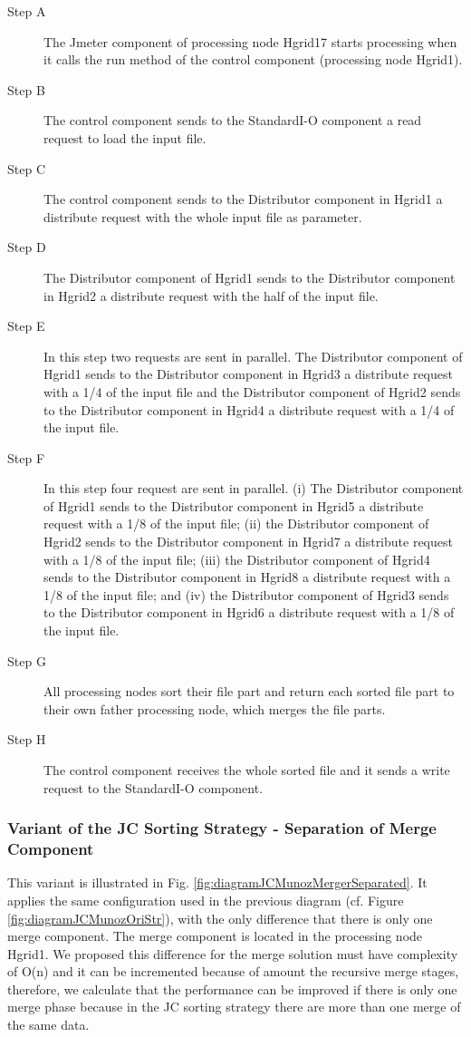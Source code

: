 \begin{description}
	\item [Step A] The Jmeter component of processing node Hgrid17 starts processing when it calls the run method of the control component (processing node Hgrid1).
	\item [Step B] The control component sends to the StandardI-O component a read request to load the input file.
	\item [Step C] The control component sends to the Distributor component in Hgrid1 a distribute request with the whole input file as parameter.
	\item [Step D] The Distributor component of Hgrid1 sends to the Distributor component in Hgrid2 a distribute request with the half of the input file.
	\item [Step E] In this step two requests are sent in parallel. The Distributor component of Hgrid1 sends to the Distributor component in Hgrid3 a distribute request with a 1/4 of the input file and the Distributor component of Hgrid2 sends to the Distributor component in Hgrid4 a distribute request with a 1/4 of the input file.
	\item [Step F] In this step four request are sent in parallel. (i) The Distributor component of Hgrid1 sends to the Distributor component in Hgrid5 a distribute request with a 1/8 of the input file; (ii) the Distributor component of Hgrid2 sends to the Distributor component in Hgrid7 a distribute request with a 1/8 of the input file; (iii) the Distributor component of Hgrid4 sends to the Distributor component in Hgrid8 a distribute request with a 1/8 of the input file; and (iv) the Distributor component of Hgrid3 sends to the Distributor component in Hgrid6 a distribute request with a 1/8 of the input file.
	\item [Step G] All processing nodes sort their file part and return each sorted file part to their own father processing node, which merges the file parts.
	\item [Step H] The control component receives the whole sorted file and it sends a write request to the StandardI-O component.
\end{description}


\subsubsection{Variant of the JC Sorting Strategy - Separation of Merge Component}
This variant is illustrated in Fig. \ref{fig:diagramJCMunozMergerSeparated}. It applies the same configuration used in the previous diagram (cf. Figure \ref{fig:diagramJCMunozOriStr}), with the only difference that there is only one merge component. The merge component is located in the processing node Hgrid1. We proposed this difference for the merge solution must have complexity of O(n) and it can be incremented because of amount the recursive merge stages, therefore, we calculate that the performance can be improved if there is only one merge phase because in the JC sorting strategy there are more than one merge of the same data.


